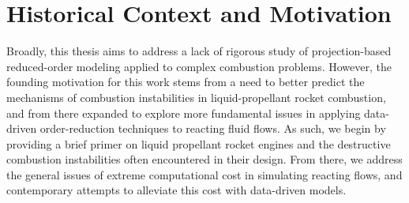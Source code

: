 \section{Historical Context and Motivation}

Broadly, this thesis aims to address a lack of rigorous study of projection-based reduced-order modeling applied to complex combustion problems. However, the founding motivation for this work stems from a need to better predict the mechanisms of combustion instabilities in liquid-propellant rocket combustion, and from there expanded to explore more fundamental issues in applying data-driven order-reduction techniques to reacting fluid flows. As such, we begin by providing a brief primer on liquid propellant rocket engines and the destructive combustion instabilities often encountered in their design. From there, we address the general issues of extreme computational cost in simulating reacting flows, and contemporary attempts to alleviate this cost with data-driven models.


